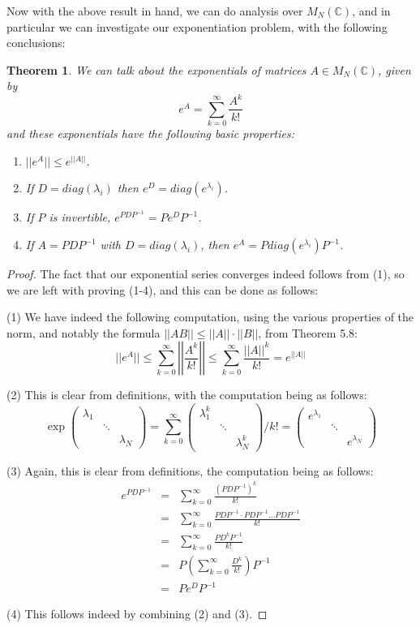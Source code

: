 \documentclass[12pt]{amsbook}
\newtheorem{theorem}{Theorem}[chapter]
\begin{document}
Now with the above result in hand, we can do analysis over $M_N(\mathbb C)$, and in particular we can investigate our exponentiation problem, with the following conclusions:

\begin{theorem}
We can talk about the exponentials of matrices $A\in M_N(\mathbb C)$, given by
$$e^A=\sum_{k=0}^\infty\frac{A^k}{k!}$$
and these exponentials have the following basic properties:
\begin{enumerate}
\item $||e^A||\leq e^{||A||}$.

\item If $D=diag(\lambda_i)$ then $e^D=diag(e^{\lambda_i})$.

\item If $P$ is invertible, $e^{PDP^{-1}}=Pe^DP^{-1}$.

\item If $A=PDP^{-1}$ with $D=diag(\lambda_i)$, then $e^A=Pdiag(e^{\lambda_i})P^{-1}$.
\end{enumerate}
\end{theorem}

\begin{proof}
The fact that our exponential series converges indeed follows from (1), so we are left with proving (1-4), and this can be done as follows:

\medskip

(1) We have indeed the following computation, using the various properties of the norm, and notably the formula $||AB||\leq||A||\cdot||B||$, from Theorem 5.8:
$$||e^A||
\leq\sum_{k=0}^\infty\left|\left|\frac{A^k}{k!}\right|\right|
\leq\sum_{k=0}^\infty\frac{||A||^k}{k!}
=e^{||A||}$$

(2) This is clear from definitions, with the computation being as follows:
$$\exp\begin{pmatrix}
\lambda_1\\
&\ddots\\
&&\lambda_N\end{pmatrix}
=\sum_{k=0}^\infty\begin{pmatrix}
\lambda_1^k\\
&\ddots\\
&&\lambda_N^k\end{pmatrix}\Big/k!
=\begin{pmatrix}
e^{\lambda_1}\\
&\ddots\\
&&e^{\lambda_N}\end{pmatrix}$$

(3) Again, this is clear from definitions, the computation being as follows:
\begin{eqnarray*}
e^{PDP^{-1}}
&=&\sum_{k=0}^\infty\frac{(PDP^{-1})^k}{k!}\\
&=&\sum_{k=0}^\infty\frac{PDP^{-1}\cdot PDP^{-1}\ldots PDP^{-1}}{k!}\\
&=&\sum_{k=0}^\infty\frac{PD^kP^{-1}}{k!}\\
&=&P\left(\sum_{k=0}^\infty\frac{D^k}{k!}\right)P^{-1}\\
&=&Pe^DP^{-1}
\end{eqnarray*}

(4) This follows indeed by combining (2) and (3).
\end{proof}
\end{document}
